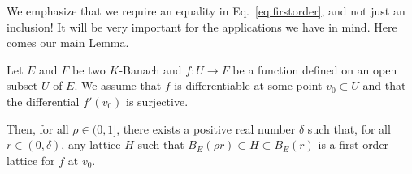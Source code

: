 \documentclass{lms}
\begin{document}
We emphasize that we require an equality in Eq.~\eqref{eq:firstorder}, 
and not just an inclusion! It will be very important for the 
applications we have in mind.
Here comes our main Lemma.

\begin{lem} \label{lem:main}
Let $E$ and $F$ be two $K$-Banach and $f : U 
\rightarrow F$ be a function defined on an open subset $U$ of $E$.
We assume that $f$ is differentiable at some point $v_0 \subset 
U$ and that the differential $f'(v_0)$ is surjective. 

Then, for all $\rho \in (0, 1]$, there exists a positive real 
number $\delta$ such that, for all $r \in (0, \delta)$, any lattice
$H$ such that $B^-_E(\rho r) \subset H \subset B_E(r)$ is a first
order lattice for $f$ at $v_0$.
\end{lem}
\end{document}
